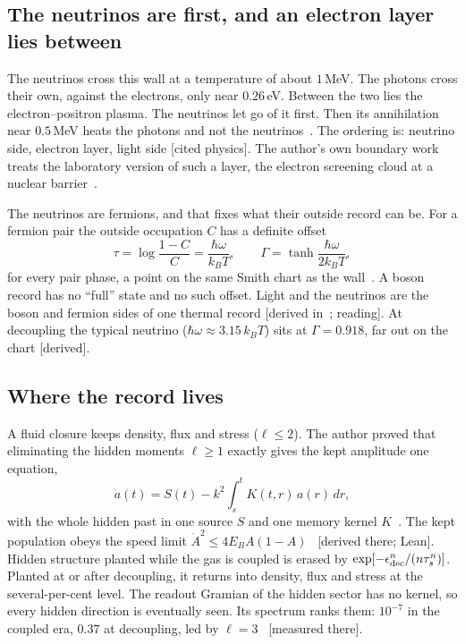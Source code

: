 \documentclass[11pt]{article}
\theoremstyle{definition}\newtheorem{hypothesis}{Hypothesis}\newtheorem{prediction}{Prediction}
\theoremstyle{remark}\newtheorem{remark}[theorem]{Remark}
\newcommand{\grade}[1]{\textsf{\small[#1]}}
\begin{document}
\subsection{The neutrinos are first, and an electron layer lies between}
The neutrinos cross this wall at a temperature of about $1$\,MeV. The photons cross their own, against the electrons, only near $0.26$\,eV. Between the two lies the electron--positron plasma. The neutrinos let go of it first. Then its annihilation near $0.5$\,MeV heats the photons and not the neutrinos~\cite{Dolgov}. The ordering is: neutrino side, electron layer, light side \grade{cited physics}. The author's own boundary work treats the laboratory version of such a layer, the electron screening cloud at a nuclear barrier~\cite{Screen}.

The neutrinos are fermions, and that fixes what their outside record can be. For a fermion pair the outside occupation $C$ has a definite offset
\begin{equation}
\tau=\log\frac{1-C}{C}=\frac{\hbar\omega}{k_BT},\qquad \Gamma=\tanh\frac{\hbar\omega}{2k_BT},
\end{equation}
for every pair phase, a point on the same Smith chart as the wall~\cite{BH,Offset}. A boson record has no ``full'' state and no such offset. Light and the neutrinos are the boson and fermion sides of one thermal record \grade{derived in~\cite{BH}; reading}. At decoupling the typical neutrino ($\hbar\omega\approx3.15\,k_BT$) sits at $\Gamma=0.918$, far out on the chart \grade{derived}.

\subsection{Where the record lives}
A fluid closure keeps density, flux and stress ($\ell\le2$). The author proved that eliminating the hidden moments $\ell\ge1$ exactly gives the kept amplitude one equation,
\begin{equation}
\dot a(t)=S(t)-k^2\!\int_s^tK(t,r)\,a(r)\,dr,
\end{equation}
with the whole hidden past in one source $S$ and one memory kernel $K$~\cite{NU10}. The kept population obeys the speed limit $\dot A^2\le4E_BA(1-A)$~\cite{NU10} \grade{derived there; Lean}. Hidden structure planted while the gas is coupled is erased by $\exp[-\epsilon_{\rm dec}^n/(n\tau_s^n)]$. Planted at or after decoupling, it returns into density, flux and stress at the several-per-cent level. The readout Gramian of the hidden sector has no kernel, so every hidden direction is eventually seen. Its spectrum ranks them: $10^{-7}$ in the coupled era, $0.37$ at decoupling, led by $\ell=3$~\cite{NU10} \grade{measured there}.
\end{document}
